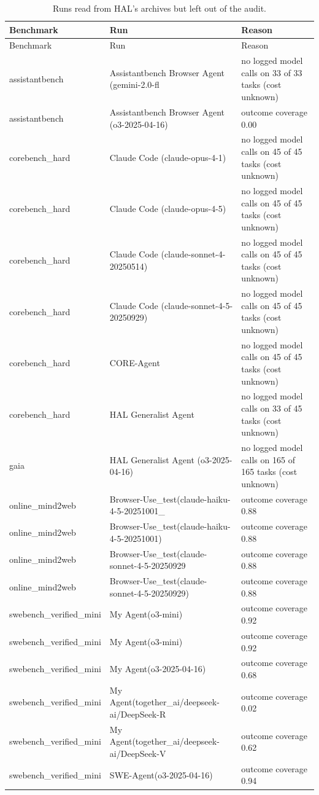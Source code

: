 \begin{longtable}{llp{7cm}}
\caption{Runs read from HAL's archives but left out of the audit.}\label{tab:supp-exclusions}\\
\toprule
Benchmark & Run & Reason \\
\midrule
\endfirsthead
\toprule
Benchmark & Run & Reason \\
\midrule
\endhead
\bottomrule
\endfoot
assistantbench & Assistantbench Browser Agent (gemini-2.0-fl~ & no logged model calls on 33 of 33 tasks (cost unknown) \\
assistantbench & Assistantbench Browser Agent (o3-2025-04-16) & outcome coverage 0.00 \\
corebench\_hard & Claude Code (claude-opus-4-1) & no logged model calls on 45 of 45 tasks (cost unknown) \\
corebench\_hard & Claude Code (claude-opus-4-5) & no logged model calls on 45 of 45 tasks (cost unknown) \\
corebench\_hard & Claude Code (claude-sonnet-4-20250514) & no logged model calls on 45 of 45 tasks (cost unknown) \\
corebench\_hard & Claude Code (claude-sonnet-4-5-20250929) & no logged model calls on 45 of 45 tasks (cost unknown) \\
corebench\_hard & CORE-Agent & no logged model calls on 45 of 45 tasks (cost unknown) \\
corebench\_hard & HAL Generalist Agent & no logged model calls on 33 of 45 tasks (cost unknown) \\
gaia & HAL Generalist Agent (o3-2025-04-16) & no logged model calls on 165 of 165 tasks (cost unknown) \\
online\_mind2web & Browser-Use\_test(claude-haiku-4-5-20251001\_~ & outcome coverage 0.88 \\
online\_mind2web & Browser-Use\_test(claude-haiku-4-5-20251001) & outcome coverage 0.88 \\
online\_mind2web & Browser-Use\_test(claude-sonnet-4-5-20250929~ & outcome coverage 0.88 \\
online\_mind2web & Browser-Use\_test(claude-sonnet-4-5-20250929) & outcome coverage 0.88 \\
swebench\_verified\_mini & My Agent(o3-mini) & outcome coverage 0.92 \\
swebench\_verified\_mini & My Agent(o3-mini) & outcome coverage 0.92 \\
swebench\_verified\_mini & My Agent(o3-2025-04-16) & outcome coverage 0.68 \\
swebench\_verified\_mini & My Agent(together\_ai/deepseek-ai/DeepSeek-R~ & outcome coverage 0.02 \\
swebench\_verified\_mini & My Agent(together\_ai/deepseek-ai/DeepSeek-V~ & outcome coverage 0.62 \\
swebench\_verified\_mini & SWE-Agent(o3-2025-04-16) & outcome coverage 0.94 \\
\end{longtable}
